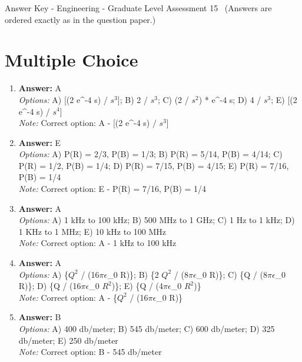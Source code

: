 \documentclass[12pt]{article}
\begin{document}
\begin{center}
Answer Key - Engineering - Graduate Level Assessment 15 \
\small (Answers are ordered exactly as in the question paper.)
\end{center}

\section*{Multiple Choice}
\begin{enumerate}[label=\arabic*.]
\item \textbf{Answer:} A
\\ \textit{Options:} A) [(2 e^-4 s) / $s^3$]; B) 2 / $s^3$; C) (2 / $s^2$) * e^-4 s; D) 4 / $s^3$; E) [(2 e^-4 s) / $s^4$]
\\ \textit{Note:} Correct option: A - [(2 e^-4 s) / $s^3$]
\item \textbf{Answer:} E
\\ \textit{Options:} A) P(R) = 2/3, P(B) = 1/3; B) P(R) = 5/14, P(B) = 4/14; C) P(R) = 1/2, P(B) = 1/4; D) P(R) = 7/15, P(B) = 4/15; E) P(R) = 7/16, P(B) = 1/4
\\ \textit{Note:} Correct option: E - P(R) = 7/16, P(B) = 1/4
\item \textbf{Answer:} A
\\ \textit{Options:} A) 1 kHz to 100 kHz; B) 500 MHz to 1 GHz; C) 1 Hz to 1 kHz; D) 1 KHz to 1 MHz; E) 10 kHz to 100 MHz
\\ \textit{Note:} Correct option: A - 1 kHz to 100 kHz
\item \textbf{Answer:} A
\\ \textit{Options:} A) \{$Q^2$ / (16\ensuremath{\pi}\ensuremath{\epsilon}\_0 R)\}; B) \{2 $Q^2$ / (8\ensuremath{\pi}\ensuremath{\epsilon}\_0 R)\}; C) \{Q / (8\ensuremath{\pi}\ensuremath{\epsilon}\_0 R)\}; D) \{Q / (16\ensuremath{\pi}\ensuremath{\epsilon}\_0 $R^2$)\}; E) \{Q / (4\ensuremath{\pi}\ensuremath{\epsilon}\_0 $R^2$)\}
\\ \textit{Note:} Correct option: A - \{$Q^2$ / (16\ensuremath{\pi}\ensuremath{\epsilon}\_0 R)\}
\item \textbf{Answer:} B
\\ \textit{Options:} A) 400 db/meter; B) 545 db/meter; C) 600 db/meter; D) 325 db/meter; E) 250 db/meter
\\ \textit{Note:} Correct option: B - 545 db/meter
\end{enumerate}
\end{document}
